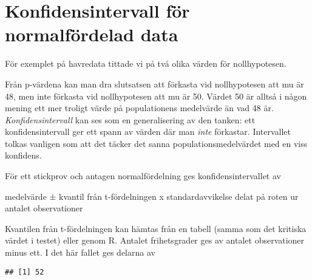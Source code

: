 \documentclass[
]{book}
\newenvironment{Shaded}{\begin{snugshade}}{\end{snugshade}}
\newcommand{\AttributeTok}[1]{\textcolor[rgb]{0.77,0.63,0.00}{#1}}
\newcommand{\DecValTok}[1]{\textcolor[rgb]{0.00,0.00,0.81}{#1}}
\newcommand{\FunctionTok}[1]{\textcolor[rgb]{0.00,0.00,0.00}{#1}}
\newcommand{\NormalTok}[1]{#1}
\newcommand{\SpecialCharTok}[1]{\textcolor[rgb]{0.00,0.00,0.00}{#1}}
\theoremstyle{definition}
\theoremstyle{definition}
\theoremstyle{definition}
\theoremstyle{definition}
\theoremstyle{remark}
\begin{document}
\hypertarget{konfidensintervall-fuxf6r-normalfuxf6rdelad-data}{%
\section{Konfidensintervall för normalfördelad data}\label{konfidensintervall-fuxf6r-normalfuxf6rdelad-data}}

För exemplet på havredata tittade vi på två olika värden för nollhypotesen.

\begin{Shaded}
\end{Shaded}

Från p-värdena kan man dra slutsatsen att förkasta vid nollhypotesen att mu är 48, men inte förkasta vid nollhypotesen att mu är 50. Värdet 50 är alltså i någon mening ett mer troligt värde på populationens medelvärde än vad 48 är. \emph{Konfidensintervall} kan ses som en generalisering av den tanken: ett konfidensintervall ger ett spann av värden där man \emph{inte} förkastar. Intervallet tolkas vanligen som att det täcker det sanna populationsmedelvärdet med en viss konfidens.

För ett stickprov och antagen normalfördelning ges konfidensintervallet av

medelvärde ± kvantil från t-fördelningen x standardavvikelse delat på roten ur antalet observationer

Kvantilen från t-fördelningen kan hämtas från en tabell (samma som det kritiska värdet i testet) eller genom R. Antalet frihetsgrader ges av antalet observationer minus ett. I det här fallet ges delarna av

\begin{Shaded}
\end{Shaded}

\begin{verbatim}
## [1] 52
\end{verbatim}

\begin{Shaded}
\end{Shaded}
\end{document}
